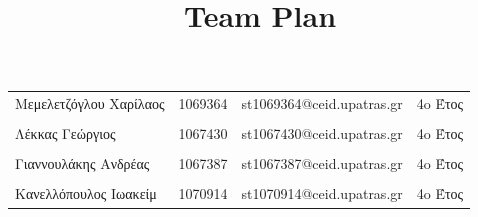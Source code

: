 \documentclass{../ol-softwaremanual}
\begin{document}
	
	
	\begin{titlepage}
		
		
		\title{\en Team Plan \\}
	\end{titlepage}
	
	
	\maketitle
	
	\newpage
	
	
	\vspace{20pt}
	
	
	
	\begin{table}[htbp!]
		
		\begin{tabular}{llll}
			Μεμελετζόγλου Χαρίλαος & 1069364 & \en st1069364@ceid.upatras.gr & 4o Έτος   \\ 
			\\ Λέκκας Γεώργιος      &      1067430    &   \en st1067430@ceid.upatras.gr & 4o Έτος  \\
			\\ Γιαννουλάκης Ανδρέας        &   1067387       & \en st1067387@ceid.upatras.gr & 4o Έτος           \\
			\\ Κανελλόπουλος Ιωακείμ        &  1070914        &    \en st1070914@ceid.upatras.gr & 4o Έτος        \\ 
		\end{tabular}
	\end{table}
	
\end{document}
